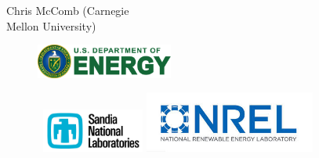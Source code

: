 {\begin{minipage}{0.5\textwidth} %
\begin{center} 
Chris McComb (Carnegie \\Mellon University) 
\end{center} 
\end{minipage}}
\vspace{1cm}
        \begin{figure}[!h]
        \centering
        \includegraphics[width=0.4\textwidth]{acknowledgments/images/DOE}
        \end{figure}

        \begin{figure}[!h]
        \centering\
        \includegraphics[width=0.3\textwidth]{acknowledgments/images/SNL}
        \includegraphics[width=0.5\textwidth]{acknowledgments/images/NREL}
        \end{figure}